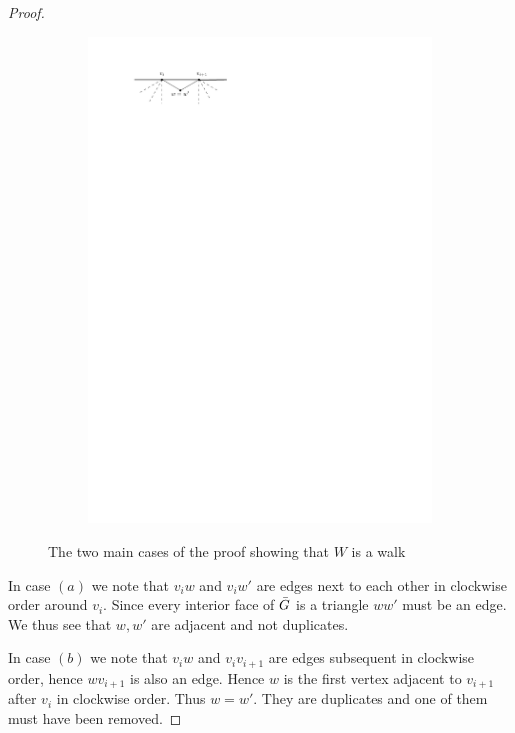 \begin{proof}
\begin{figure}[h]
\begin{subfigure}[b]{0.5\linewidth}
          \includegraphics[width=\linewidth]{redAlgo/img/walkProofB}
          \vspace{1cm}

          \caption{}
      \end{subfigure}

      	\caption{The two main cases of the proof showing that $W$ is a walk}
  	\label{fig:walkproof}
  \end{figure}


  In case $(a)$ we note that $v_i w$ and $v_i w'$ are edges next to each other in clockwise order around $v_i$. Since every interior face of $\bar{G}$ is a triangle $ww'$ must be an edge. We thus see that $w, w'$ are adjacent and not duplicates.

  In case $(b)$ we note that $v_i w$ and $v_i v_{i+1}$ are edges subsequent in clockwise order, hence $wv_{i+1}$ is also an edge. Hence $w$ is the first vertex adjacent to $v_{i+1}$ after $v_i$ in clockwise order. Thus $w= w'$. They are duplicates and one of them must have been removed.


\end{proof}
